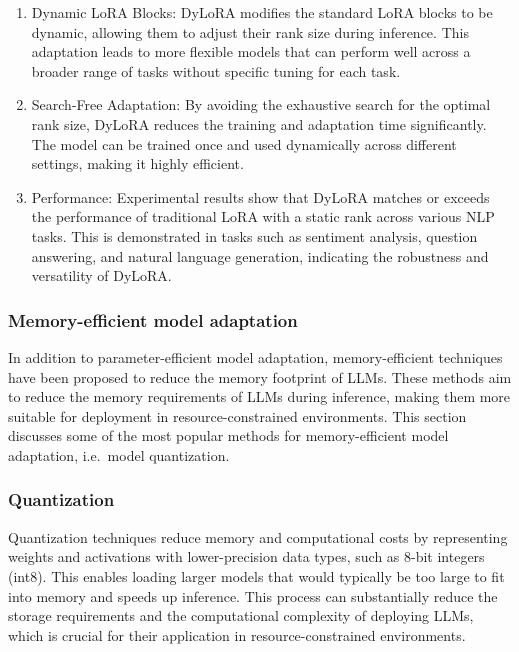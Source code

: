 \begin{enumerate}
	\item Dynamic LoRA Blocks: DyLoRA modifies the standard LoRA blocks to be dynamic, allowing them to adjust their rank size during inference. This adaptation leads to more flexible models that can perform well across a broader range of tasks without specific tuning for each task.

	\item Search-Free Adaptation: By avoiding the exhaustive search for the optimal rank size, DyLoRA reduces the training and adaptation time significantly. The model can be trained once and used dynamically across different settings, making it highly efficient.

	\item Performance: Experimental results show that DyLoRA matches or exceeds the performance of traditional LoRA with a static rank across various NLP tasks. This is demonstrated in tasks such as sentiment analysis, question answering, and natural language generation, indicating the robustness and versatility of DyLoRA.

\end{enumerate}

\subsubsection{Memory-efficient model adaptation}
\label{subsubsec:memory-efficient}

In addition to parameter-efficient model adaptation, memory-efficient techniques have been proposed to reduce the memory footprint of LLMs.
These methods aim to reduce the memory requirements of LLMs during inference, making them more suitable for deployment in resource-constrained environments.
This section discusses some of the most popular methods for memory-efficient model adaptation, i.e.\ model quantization.

\subsubsection{Quantization}
\label{subsubsec:quantization}

Quantization techniques reduce memory and computational costs by representing weights and activations with lower-precision data types, such as 8-bit integers (int8).
This enables loading larger models that would typically be too large to fit into memory and speeds up inference.
This process can substantially reduce the storage requirements and the computational complexity of deploying LLMs, which is crucial for their application in resource-constrained environments.

